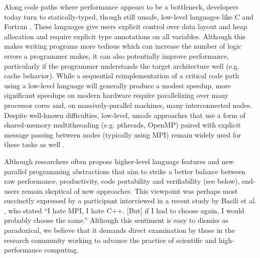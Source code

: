 \documentclass[12pt]{article}
\begin{document}
Along code paths where performance appears to be a bottleneck, developers today turn to statically-typed, though still unsafe, low-level languages like C and Fortran \cite{4222616}. These languages give users explicit control over data layout and heap allocation and require explicit type annotations on all variables. Although this makes writing programs more tedious which can increase the number of logic errors a programmer makes, it can also potentially improve performance, particularly if the programmer understands the target architecture well (e.g. cache behavior). While a sequential reimplementation of a critical code path using a low-level language will generally produce a modest speedup, more significant speedups on modern hardware require parallelizing over many processor cores and, on massively-parallel machines, many interconnected nodes. Despite well-known difficulties, low-level, unsafe  approaches that use a form of shared-memory  multithreading (e.g. pthreads, OpenMP) paired with explicit message passing between nodes (typically using MPI) remain widely used for these tasks as well \cite{4222616, basili2008understanding}. 

Although researchers often propose higher-level language features and new parallel programming abstractions that aim to strike a better balance between raw performance, productivity, code portability and verifiability (see below), end-users remain skeptical of new approaches. This viewpoint was perhaps most succinctly expressed by a participant interviewed in a recent study by Basili et al. \cite{basili2008understanding}, who stated ``I hate MPI, I hate C++. [But] if I had to choose again, I would probably choose the same.'' Although this sentiment is easy to dismiss as paradoxical, we believe that it demands direct examination by those in the research community working to advance the practice of scientific and high-performance computing. 
%
% 
\end{document}
